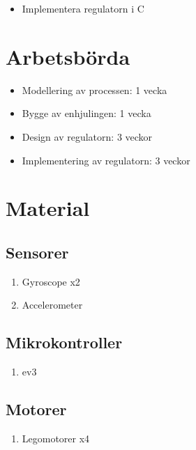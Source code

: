 \documentclass[a4paper]{article}
\begin{document}
    \begin{itemize}
    \item [] Implementera regulatorn i C
    \end{itemize}
    
    
\section{Arbetsbörda}

\begin{itemize}
\item[] Modellering av processen: 1 vecka

\item[] Bygge av enhjulingen: 1 vecka

\item[] Design av regulatorn: 3 veckor

\item[] Implementering av regulatorn: 3 veckor
\end{itemize}

\section{Material}



\subsection*{Sensorer}
\begin{enumerate}
\item [] Gyroscope x2
\item [] Accelerometer
\end{enumerate}

\subsection*{Mikrokontroller}
\begin{enumerate}
\item [] ev3
\end{enumerate}

\subsection*{Motorer}

\begin{enumerate}
\item [] Legomotorer x4
\end{enumerate}
\end{document}
